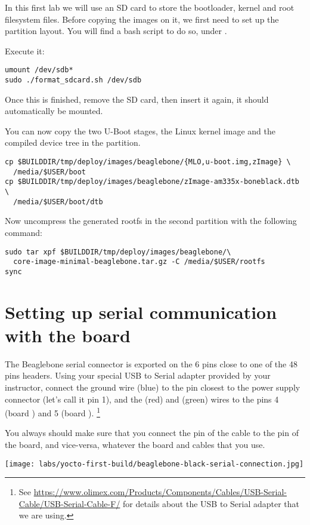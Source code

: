 In this first lab we will use an SD card to store the bootloader, kernel and
root filesystem files. Before copying the images on it, we first need to set up the
partition layout. You will find a bash script to do so, under
.

Execute it:
\begin{verbatim}
umount /dev/sdb*
sudo ./format_sdcard.sh /dev/sdb
\end{verbatim}

Once this is finished, remove the SD card, then insert it again, it
should automatically be mounted.

You can now copy the two U-Boot stages, the Linux kernel image and the compiled
device tree in the  partition.
\begin{verbatim}
cp $BUILDDIR/tmp/deploy/images/beaglebone/{MLO,u-boot.img,zImage} \
  /media/$USER/boot
cp $BUILDDIR/tmp/deploy/images/beaglebone/zImage-am335x-boneblack.dtb \
  /media/$USER/boot/dtb
\end{verbatim}

Now uncompress the generated rootfs in the second partition with the
following  command:
\begin{verbatim}
sudo tar xpf $BUILDDIR/tmp/deploy/images/beaglebone/\
  core-image-minimal-beaglebone.tar.gz -C /media/$USER/rootfs
sync
\end{verbatim}

\section{Setting up serial communication with the board}

The Beaglebone serial connector is exported on the 6 pins close to one
of the 48 pins headers. Using your special USB to Serial adapter provided
by your instructor, connect the ground wire (blue) to the pin closest
to the power supply connector (let's call it pin 1), and the \code{TX} (red)
and \code{RX} (green) wires to the pins 4 (board \code{RX}) and
5 (board \code{TX}). \footnote{See
\url{https://www.olimex.com/Products/Components/Cables/USB-Serial-Cable/USB-Serial-Cable-F/}
for details about the USB to Serial adapter that we are using.}

You always should make sure that you connect the \code{TX} pin of the cable
to the \code{RX} pin of the board, and vice-versa, whatever the board and
cables that you use.

\begin{center}
\texttt{[image: labs/yocto-first-build/beaglebone-black-serial-connection.jpg]}
\end{center}

